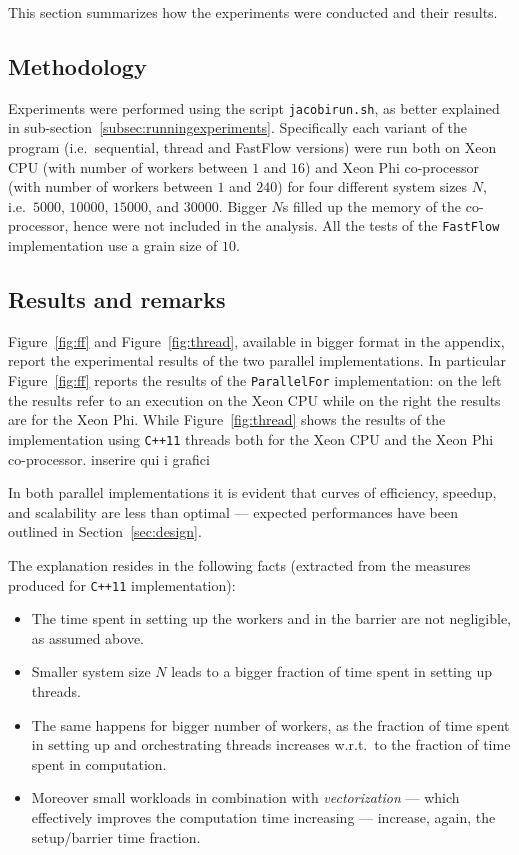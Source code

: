 This section summarizes how the experiments were conducted and their results.

\subsection{Methodology} \label{subsec:methodology}
Experiments were performed using the script \verb|jacobirun.sh|, as better explained in sub-section~\ref{subsec:runningexperiments}.
Specifically each variant of the program (i.e.\ sequential, thread and FastFlow versions) were run both on Xeon CPU (with number of workers between $1$ and $16$) and Xeon Phi co-processor (with number of workers between $1$ and $240$) for four different system sizes $N$, i.e.\ $5000$, $10000$, $15000$, and $30000$.
Bigger $N$s filled up the memory of the co-processor, hence were not included in the analysis.
All the tests of the \verb|FastFlow| implementation use a grain size of $10$.

\subsection{Results and remarks} \label{subsec:results}
Figure~\ref{fig:ff} and Figure~\ref{fig:thread}, available in bigger format in the appendix, report the experimental results of the two parallel implementations.
In particular Figure~\ref{fig:ff} reports the results of the \verb|ParallelFor| implementation: on the left the results refer to an execution on the Xeon CPU while on the right the results are for the Xeon Phi.
While Figure~\ref{fig:thread} shows the results of the implementation using \verb|C++11| threads both for the Xeon CPU and the Xeon Phi co-processor.
\alert{inserire qui i grafici}

In both parallel implementations it is evident that curves of efficiency, speedup, and scalability are less than optimal --- expected performances have been outlined in Section~\ref{sec:design}.

The explanation resides in the following facts (extracted from the measures produced for \verb|C++11| implementation):
\begin{itemize}
	\item The time spent in setting up the workers and in the barrier are not negligible, as assumed above.
	\item Smaller system size $N$ leads to a bigger fraction of time spent in setting up threads.
	\item The same happens for bigger number of workers, as the fraction of time spent in setting up and orchestrating threads increases w.r.t.\ to the fraction of time spent in computation.
	\item Moreover small workloads in combination with \emph{vectorization} --- which effectively improves the computation time increasing --- increase, again, the setup/barrier time fraction.
\end{itemize}

